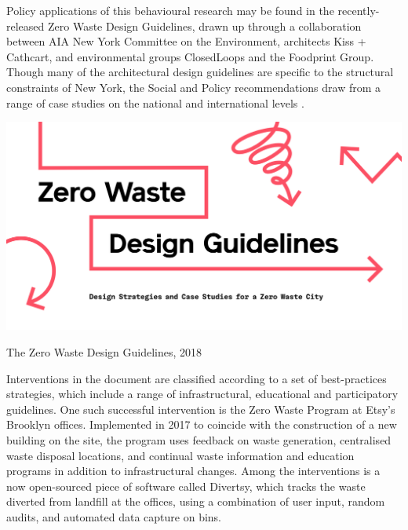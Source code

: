 \documentclass[nofonts,nols,justified,nobib]{tufte-book}
\begin{document}
Policy applications of this behavioural research may be found in the recently-released Zero Waste Design Guidelines, drawn up through a collaboration between AIA New York Committee on the Environment, architects Kiss + Cathcart, and environmental groups ClosedLoops and the Foodprint Group. Though many of the architectural design guidelines are specific to the structural constraints of New York, the Social and Policy recommendations draw from a range of case studies on the national and international levels \cite{aia_new_york_zero_2017}.

\begin{marginfigure}
\includegraphics[width=\textwidth]{img/1/zero-waste-guidelines.png}
\caption{The Zero Waste Design Guidelines, 2018 \cite{aia_new_york_zero_2017} \label{b}}
\end{marginfigure}

Interventions in the document are classified according to a set of best-practices strategies, which include a range of infrastructural, educational and participatory guidelines. One such successful intervention is the Zero Waste Program at Etsy's Brooklyn offices. Implemented in 2017 to coincide with the construction of a new building on the site, the program uses feedback on waste generation, centralised waste disposal locations, and continual waste information and education programs in addition to infrastructural changes. Among the interventions is a now open-sourced piece of software called Divertsy, which tracks the waste diverted from landfill at the offices, using a combination of user input, random audits, and automated data capture on bins.
\end{document}

